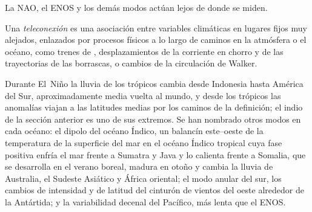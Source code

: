 \begin{omfigure}
\centering
\par{}
\end{omfigure}

La NAO, el ENOS y los demás modos actúan lejos de donde se miden.

\begin{definition}[Teleconexión]\label{def:b2:climate-variability:teleconnection}
Una \emph{teleconexión} es una asociación entre variables climáticas en
lugares fijos muy alejados, enlazados por procesos físicos a lo largo de caminos en la atmósfera o el
océano, como trenes de , desplazamientos de la corriente en chorro y de las trayectorias de las borrascas, o cambios
de la circulación de Walker.
\end{definition}

Durante El~Niño la lluvia de los trópicos cambia desde Indonesia hasta América del Sur, aproximadamente media vuelta
al mundo, y desde los trópicos las anomalías viajan a las latitudes medias por los caminos
de la definición; el  indio de la sección anterior es uno de sus extremos. Se han nombrado otros modos
en cada océano: el dipolo del océano Índico, un balancín este--oeste de la temperatura de la superficie
del mar en el océano Índico tropical cuya fase positiva enfría el mar frente a Sumatra y Java
y lo calienta frente a Somalia, que se desarrolla en el verano boreal, madura en otoño y cambia
la lluvia de Australia, el Sudeste Asiático y África oriental; el modo anular del sur, los cambios de
intensidad y de latitud del cinturón de vientos del oeste alrededor de la Antártida; y la variabilidad decenal del
Pacífico, más lenta que el ENOS.

